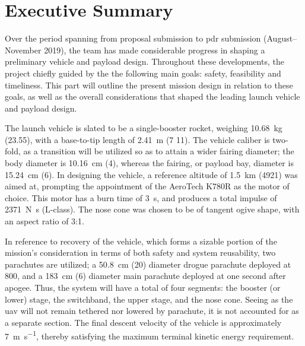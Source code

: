 \chapter{Executive Summary}

Over the period spanning from proposal submission to \gls{pdr} submission (August--November 2019), the team has made considerable progress in shaping a preliminary vehicle and payload design. Throughout these developments, the project chiefly guided by the the following main goals: safety, feasibility and timeliness. This part will outline the present mission design in relation to these goals, as well as the overall considerations that shaped the leading launch vehicle and payload design.

The launch vehicle is slated to be a single-booster rocket, weighing \SI{10.68}{\kilo\gram} (\SI{23.55}{\poundm}), with a base-to-tip length of \SI{2.41}{\meter} (\SI{7}{\feet} \SI{11}{\inch}). The vehicle caliber is two-fold, as a transition will be utilized so as to attain a wider fairing diameter; the body diameter is \SI{10.16}{\centi\meter} (\SI{4}{\inch}), whereas the fairing, or payload bay, diameter is \SI{15.24}{\centi\meter} (\SI{6}{\inch}). In designing the vehicle, a reference altitude of \SI{1.5}{\kilo\meter} (\SI{4921}{\feet}) was aimed at, prompting the appointment of the AeroTech K780R as the motor of choice. This motor has a burn time of \SI{3}{\second}, and produces a total impulse of \SI{2371}{\newton\second} (L-class). The nose cone was chosen to be of tangent ogive shape, with an aspect ratio of 3:1.

In reference to recovery of the vehicle, which forms a sizable portion of the mission's consideration in terms of both safety and system reusability, two parachutes are utilized; a \SI{50.8}{\centi\meter} (\SI{20}{\inch}) diameter drogue parachute deployed at \SI{800}{\feet}, and a \SI{183}{\centi\meter} (\SI{6}{\feet}) diameter main parachute deployed at one second after apogee. Thus, the system will have a total of four segments: the booster (or lower) stage, the switchband, the upper stage, and the nose cone. Seeing as the \gls{uav} will not remain tethered nor lowered by parachute, it is not accounted for as a separate section. The final descent velocity of the vehicle is approximately \SI{7}{\meter\per\second}, thereby satisfying the maximum terminal kinetic energy requirement.

